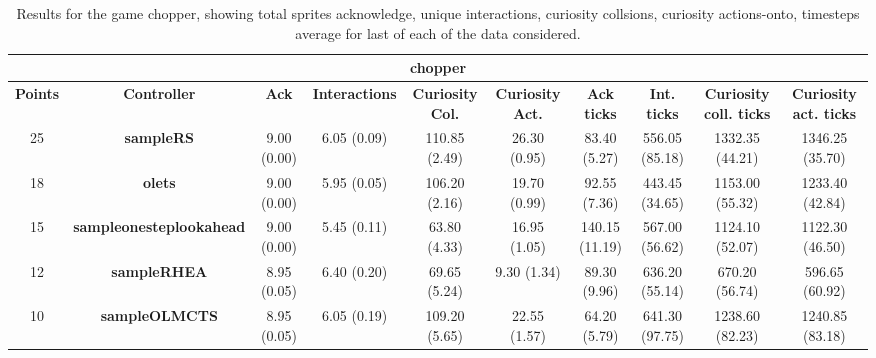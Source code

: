 \begin{table*}[!t]
\begin{center}
\begin{adjustbox}{width=1\textwidth}
\begin{tabular}{|c|c|c|c|c|c|c|c|c|c|}
\multicolumn{10}{c}{\textbf{chopper}}\\
\hline
\textbf{Points} & \textbf{Controller} & \textbf{Ack} & \textbf{Interactions} & \textbf{Curiosity Col.} & \textbf{Curiosity Act.} & \textbf{Ack ticks} & \textbf{Int. ticks} & \textbf{Curiosity coll. ticks} & \textbf{Curiosity act. ticks}\\
\hline
25 & \textbf{sampleRS} & 9.00 (0.00) & 6.05 (0.09) & 110.85 (2.49) & 26.30 (0.95) & 83.40 (5.27) & 556.05 (85.18) & 1332.35 (44.21) & 1346.25 (35.70)
 \\
\hline
18 & \textbf{olets} & 9.00 (0.00) & 5.95 (0.05) & 106.20 (2.16) & 19.70 (0.99) & 92.55 (7.36) & 443.45 (34.65) & 1153.00 (55.32) & 1233.40 (42.84)
 \\
\hline
15 & \textbf{sampleonesteplookahead} & 9.00 (0.00) & 5.45 (0.11) & 63.80 (4.33) & 16.95 (1.05) & 140.15 (11.19) & 567.00 (56.62) & 1124.10 (52.07) & 1122.30 (46.50)
 \\
\hline
12 & \textbf{sampleRHEA} & 8.95 (0.05) & 6.40 (0.20) & 69.65 (5.24) & 9.30 (1.34) & 89.30 (9.96) & 636.20 (55.14) & 670.20 (56.74) & 596.65 (60.92)
 \\
\hline
10 & \textbf{sampleOLMCTS} & 8.95 (0.05) & 6.05 (0.19) & 109.20 (5.65) & 22.55 (1.57) & 64.20 (5.79) & 641.30 (97.75) & 1238.60 (82.23) & 1240.85 (83.18)
 \\
\hline
\end{tabular}
\end{adjustbox}
\caption{Results for the game chopper, showing total sprites acknowledge, unique interactions, curiosity collsions, curiosity actions-onto, timesteps average for last of each of the data considered.}
\label{tab:weights}
\end{center}
\end{table*}

